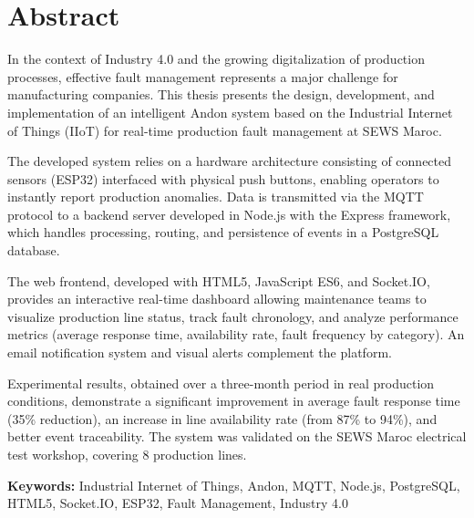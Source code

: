 \chapter*{Abstract}

In the context of Industry 4.0 and the growing digitalization of production processes, effective fault management represents a major challenge for manufacturing companies. This thesis presents the design, development, and implementation of an intelligent Andon system based on the Industrial Internet of Things (IIoT) for real-time production fault management at SEWS Maroc.

The developed system relies on a hardware architecture consisting of connected sensors (ESP32) interfaced with physical push buttons, enabling operators to instantly report production anomalies. Data is transmitted via the MQTT protocol to a backend server developed in Node.js with the Express framework, which handles processing, routing, and persistence of events in a PostgreSQL database.

The web frontend, developed with HTML5, JavaScript ES6, and Socket.IO, provides an interactive real-time dashboard allowing maintenance teams to visualize production line status, track fault chronology, and analyze performance metrics (average response time, availability rate, fault frequency by category). An email notification system and visual alerts complement the platform.

Experimental results, obtained over a three-month period in real production conditions, demonstrate a significant improvement in average fault response time (35\% reduction), an increase in line availability rate (from 87\% to 94\%), and better event traceability. The system was validated on the SEWS Maroc electrical test workshop, covering 8 production lines.

\vspace{1em}
\noindent\textbf{Keywords:} Industrial Internet of Things, Andon, MQTT, Node.js, PostgreSQL, HTML5, Socket.IO, ESP32, Fault Management, Industry 4.0
